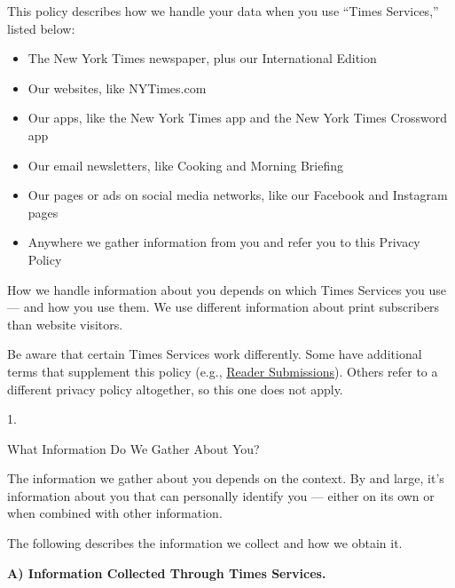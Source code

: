 This policy describes how we handle your data when you use ``Times
Services,'' listed below:

\begin{itemize}
\tightlist
\item
  The New York Times newspaper, plus our International Edition
\item
  Our websites, like NYTimes.com
\item
  Our apps, like the New York Times app and the New York Times Crossword
  app
\item
  Our email newsletters, like Cooking and Morning Briefing
\item
  Our pages or ads on social media networks, like our Facebook and
  Instagram pages
\item
  Anywhere we gather information from you and refer you to this Privacy
  Policy
\end{itemize}

How we handle information about you depends on which Times Services you
use --- and how you use them. We use different information about print
subscribers than website visitors.

Be aware that certain Times Services work differently. Some have
additional terms that supplement this policy (e.g.,
\href{https://help.nytimes3xbfgragh.onion/hc/en-us/articles/360004901454-Reader-submission-terms}{Reader
Submissions}). Others refer to a different privacy policy altogether, so
this one does not apply.

1.

What Information Do We Gather About You?

The information we gather about you depends on the context. By and
large, it's information about you that can personally identify you ---
either on its own or when combined with other information.

The following describes the information we collect and how we obtain it.

\textbf{A) Information Collected Through Times Services.}

